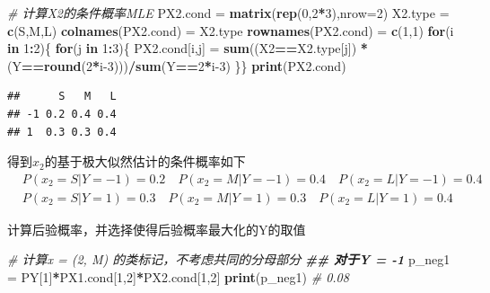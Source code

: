 \documentclass[
]{ctexart}
\newenvironment{Shaded}{\begin{snugshade}}{\end{snugshade}}
\newcommand{\AttributeTok}[1]{\textcolor[rgb]{0.13,0.29,0.53}{#1}}
\newcommand{\CommentTok}[1]{\textcolor[rgb]{0.56,0.35,0.01}{\textit{#1}}}
\newcommand{\ControlFlowTok}[1]{\textcolor[rgb]{0.13,0.29,0.53}{\textbf{#1}}}
\newcommand{\DecValTok}[1]{\textcolor[rgb]{0.00,0.00,0.81}{#1}}
\newcommand{\DocumentationTok}[1]{\textcolor[rgb]{0.56,0.35,0.01}{\textbf{\textit{#1}}}}
\newcommand{\FunctionTok}[1]{\textcolor[rgb]{0.13,0.29,0.53}{\textbf{#1}}}
\newcommand{\NormalTok}[1]{#1}
\newcommand{\OtherTok}[1]{\textcolor[rgb]{0.56,0.35,0.01}{#1}}
\newcommand{\SpecialCharTok}[1]{\textcolor[rgb]{0.81,0.36,0.00}{\textbf{#1}}}
\newcommand{\StringTok}[1]{\textcolor[rgb]{0.31,0.60,0.02}{#1}}
\begin{document}
\begin{Shaded}
\begin{Highlighting}[]
\CommentTok{\# 计算X2的条件概率MLE}
\NormalTok{PX2.cond }\OtherTok{=} \FunctionTok{matrix}\NormalTok{(}\FunctionTok{rep}\NormalTok{(}\DecValTok{0}\NormalTok{,}\DecValTok{2}\SpecialCharTok{*}\DecValTok{3}\NormalTok{),}\AttributeTok{nrow=}\DecValTok{2}\NormalTok{)}
\NormalTok{X2.type }\OtherTok{=} \FunctionTok{c}\NormalTok{(}\StringTok{\textquotesingle{}S\textquotesingle{}}\NormalTok{,}\StringTok{\textquotesingle{}M\textquotesingle{}}\NormalTok{,}\StringTok{\textquotesingle{}L\textquotesingle{}}\NormalTok{)}
\FunctionTok{colnames}\NormalTok{(PX2.cond) }\OtherTok{=}\NormalTok{ X2.type}
\FunctionTok{rownames}\NormalTok{(PX2.cond) }\OtherTok{=} \FunctionTok{c}\NormalTok{(}\StringTok{\textquotesingle{}{-}1\textquotesingle{}}\NormalTok{,}\StringTok{\textquotesingle{}1\textquotesingle{}}\NormalTok{)}
\ControlFlowTok{for}\NormalTok{(i }\ControlFlowTok{in} \DecValTok{1}\SpecialCharTok{:}\DecValTok{2}\NormalTok{)\{}
  \ControlFlowTok{for}\NormalTok{(j }\ControlFlowTok{in} \DecValTok{1}\SpecialCharTok{:}\DecValTok{3}\NormalTok{)\{}
\NormalTok{    PX2.cond[i,j] }\OtherTok{=} \FunctionTok{sum}\NormalTok{((X2}\SpecialCharTok{==}\NormalTok{X2.type[j]) }\SpecialCharTok{*}\NormalTok{ (Y}\SpecialCharTok{==}\FunctionTok{round}\NormalTok{(}\DecValTok{2}\SpecialCharTok{*}\NormalTok{i}\DecValTok{{-}3}\NormalTok{)))}\SpecialCharTok{/}\FunctionTok{sum}\NormalTok{(Y}\SpecialCharTok{==}\DecValTok{2}\SpecialCharTok{*}\NormalTok{i}\DecValTok{{-}3}\NormalTok{)}
\NormalTok{  \}\}}
\FunctionTok{print}\NormalTok{(PX2.cond)}
\end{Highlighting}
\end{Shaded}

\begin{verbatim}
##      S   M   L
## -1 0.2 0.4 0.4
## 1  0.3 0.3 0.4
\end{verbatim}

得到\(x_2\)的基于极大似然估计的条件概率如下 \begin{align*}
& P(x_2 = S|Y=-1) = 0.2 \quad P(x_2 = M|Y=-1) = 0.4 \quad P(x_2 = L|Y=-1) = 0.4 \\
& P(x_2 = S|Y=1) = 0.3 \quad P(x_2 = M|Y=1) = 0.3 \quad P(x_2 = L|Y=1) = 0.4 
\end{align*}

计算后验概率，并选择使得后验概率最大化的Y的取值

\begin{Shaded}
\begin{Highlighting}[]
\CommentTok{\# 计算x = (2, M)\textquotesingle{} 的类标记，不考虑共同的分母部分}
\DocumentationTok{\#\# 对于Y = {-}1}
\NormalTok{p\_neg1 }\OtherTok{=}\NormalTok{ PY[}\DecValTok{1}\NormalTok{]}\SpecialCharTok{*}\NormalTok{PX1.cond[}\DecValTok{1}\NormalTok{,}\DecValTok{2}\NormalTok{]}\SpecialCharTok{*}\NormalTok{PX2.cond[}\DecValTok{1}\NormalTok{,}\DecValTok{2}\NormalTok{]}
\FunctionTok{print}\NormalTok{(p\_neg1) }\CommentTok{\# 0.08}
\end{Highlighting}
\end{Shaded}
\end{document}
